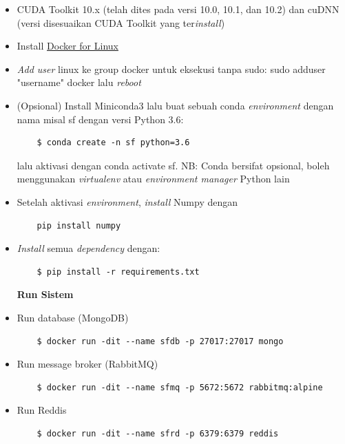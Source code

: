 \begin{itemize}
  \item CUDA Toolkit 10.x (telah dites pada versi 10.0, 10.1, dan 10.2) dan cuDNN (versi disesuaikan CUDA Toolkit yang ter\textit{install})
  \item Install \href{https://docs.docker.com/engine/install/ubuntu/}{Docker for Linux}
  \item \textit{Add user} linux ke group docker untuk eksekusi tanpa sudo: sudo adduser "username" docker lalu \textit{reboot}
  \item (Opsional) Install Miniconda3 lalu buat sebuah conda \textit{environment} dengan nama misal sf dengan versi Python 3.6:
  
  \begin{lstlisting}
    $ conda create -n sf python=3.6
  \end{lstlisting}

  lalu aktivasi dengan conda activate sf.
  NB: Conda bersifat opsional, boleh menggunakan \textit{virtualenv} atau \textit{environment manager} Python lain

  \item Setelah aktivasi \textit{environment}, \textit{install} Numpy dengan
  \begin{lstlisting}
    pip install numpy
  \end{lstlisting}  

  \item \textit{Install} semua \textit{dependency} dengan:
  
  \begin{lstlisting}
    $ pip install -r requirements.txt
  \end{lstlisting}

  \textbf{Run Sistem}
  \item Run database (MongoDB)
  
  \begin{lstlisting}
    $ docker run -dit --name sfdb -p 27017:27017 mongo
  \end{lstlisting}

  \item Run message broker (RabbitMQ)
  
  \begin{lstlisting}
    $ docker run -dit --name sfmq -p 5672:5672 rabbitmq:alpine
  \end{lstlisting}

  \item Run Reddis
  
  \begin{lstlisting}
    $ docker run -dit --name sfrd -p 6379:6379 reddis
  \end{lstlisting}


\end{itemize}
